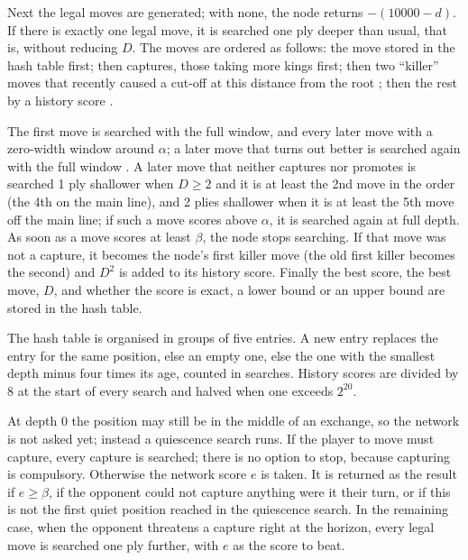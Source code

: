Next the legal moves are generated; with none, the node returns $-(10000-d)$. If
there is exactly one legal move, it is searched one ply deeper than usual, that
is, without reducing $D$. The moves are ordered as follows: the move stored in
the hash table first; then captures, those taking more kings first; then two
``killer'' moves that recently caused a cut-off at this distance from the root
\parencite{akl1977}; then the rest by a history score \parencite{schaeffer1989}.

The first move is searched with the full window, and every later move with a
zero-width window around $\alpha$; a later move that turns out better is searched
again with the full window \parencite{marsland1982}. A later move that neither
captures nor promotes is searched 1 ply shallower when $D\ge2$ and it is at least
the 2nd move in the order (the 4th on the main line), and 2 plies shallower when
it is at least the 5th move off the main line; if such a move scores above
$\alpha$, it is searched again at full depth. As soon as a move scores at least
$\beta$, the node stops searching. If that move was not a capture, it becomes the
node's first killer move (the old first killer becomes the second) and $D^2$ is
added to its history score. Finally the best score, the best move, $D$, and
whether the score is exact, a lower bound or an upper bound are stored in the
hash table.

The hash table is organised in groups of five entries. A new entry replaces the
entry for the same position, else an empty one, else the one with the smallest
depth minus four times its age, counted in searches. History scores are divided
by 8 at the start of every search and halved when one exceeds $2^{20}$.

At depth 0 the position may still be in the middle of an exchange, so the network
is not asked yet; instead a quiescence search runs. If the player to move must
capture, every capture is searched; there is no option to stop, because capturing
is compulsory. Otherwise the network score $e$ is taken. It is returned as the
result if $e \ge \beta$, if the opponent could not capture anything were it their
turn, or if this is not the first quiet position reached in the quiescence
search. In the remaining case, when the opponent threatens a capture right at the
horizon, every legal move is searched one ply further, with $e$ as the score to
beat.

